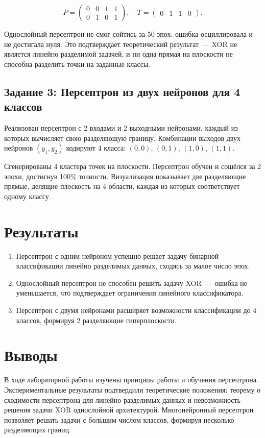 \documentclass[14pt,a4paper]{extarticle}
\begin{document}
\begin{equation}
P = \begin{pmatrix} 0 & 0 & 1 & 1 \\ 0 & 1 & 0 & 1 \end{pmatrix}, \quad
T = \begin{pmatrix} 0 & 1 & 1 & 0 \end{pmatrix}.
\end{equation}

Однослойный персептрон не смог сойтись за 50 эпох: ошибка осциллировала и не достигала нуля. Это подтверждает теоретический результат~--- XOR не является линейно разделимой задачей, и ни одна прямая на плоскости не способна разделить точки на заданные классы.

\subsection{Задание 3: Персептрон из двух нейронов для 4 классов}

Реализован персептрон с 2 входами и 2 выходными нейронами, каждый из которых вычисляет свою разделяющую границу. Комбинации выходов двух нейронов $(y_1, y_2)$ кодируют 4 класса: $(0,0)$, $(0,1)$, $(1,0)$, $(1,1)$.

Сгенерированы 4 кластера точек на плоскости. Персептрон обучен и сошёлся за 2 эпохи, достигнув 100\% точности. Визуализация показывает две разделяющие прямые, делящие плоскость на 4 области, каждая из которых соответствует одному классу.

\section{Результаты}

\begin{enumerate}
\item Персептрон с одним нейроном успешно решает задачу бинарной классификации линейно разделимых данных, сходясь за малое число эпох.
\item Однослойный персептрон не способен решить задачу XOR~--- ошибка не уменьшается, что подтверждает ограничения линейного классификатора.
\item Персептрон с двумя нейронами расширяет возможности классификации до 4 классов, формируя 2 разделяющие гиперплоскости.
\end{enumerate}



\section{Выводы}

В ходе лабораторной работы изучены принципы работы и обучения персептрона. Экспериментальные результаты подтвердили теоретические положения: теорему о сходимости персептрона для линейно разделимых данных и невозможность решения задачи XOR однослойной архитектурой. Многонейронный персептрон позволяет решать задачи с большим числом классов, формируя несколько разделяющих границ.


\end{document}
